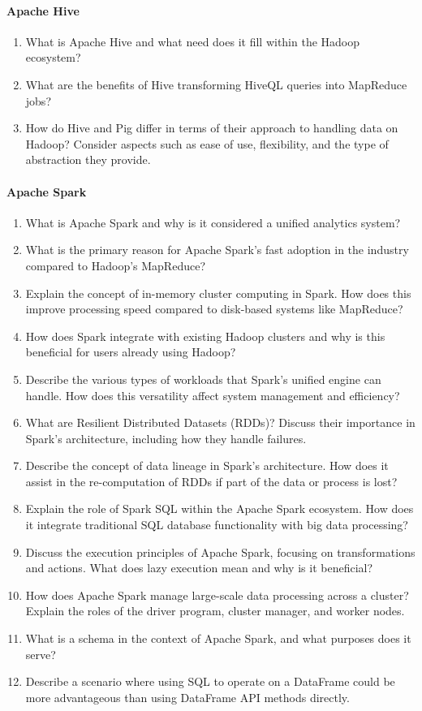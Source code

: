 \paragraph*{Apache Hive}
\begin{enumerate}
	\item What is Apache Hive and what need does it fill within the Hadoop ecosystem?
	\item What are the benefits of Hive transforming HiveQL queries into MapReduce jobs?
	\item How do Hive and Pig differ in terms of their approach to handling data on Hadoop? Consider aspects such as ease of use, flexibility, and the type of abstraction they provide.
\end{enumerate}
\begin{advanced}
\paragraph*{Apache Spark}
\begin{enumerate}
    \item What is Apache Spark and why is it considered a unified analytics system?
	\item What is the primary reason for Apache Spark's fast adoption in the industry compared to Hadoop's MapReduce?
    \item Explain the concept of in-memory cluster computing in Spark. How does this improve processing speed compared to disk-based systems like MapReduce?
    \item How does Spark integrate with existing Hadoop clusters and why is this beneficial for users already using Hadoop?
    \item Describe the various types of workloads that Spark's unified engine can handle. How does this versatility affect system management and efficiency?
    \item What are Resilient Distributed Datasets (RDDs)? Discuss their importance in Spark's architecture, including how they handle failures.
	\item Describe the concept of data lineage in Spark's architecture. How does it assist in the re-computation of RDDs if part of the data or process is lost?
    \item Explain the role of Spark SQL within the Apache Spark ecosystem. How does it integrate traditional SQL database functionality with big data processing?
    \item Discuss the execution principles of Apache Spark, focusing on transformations and actions. What does lazy execution mean and why is it beneficial?
    \item How does Apache Spark manage large-scale data processing across a cluster? Explain the roles of the driver program, cluster manager, and worker nodes.
	\item What is a schema in the context of Apache Spark, and what purposes does it serve?
	\item Describe a scenario where using SQL to operate on a DataFrame could be more advantageous than using DataFrame API methods directly.
\end{enumerate}

\end{advanced}

